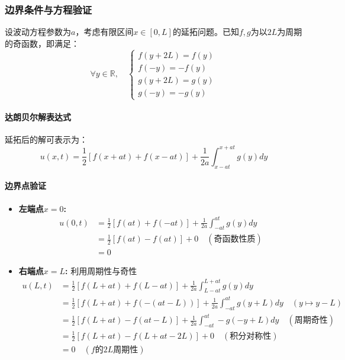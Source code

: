 \documentclass[12pt,a4paper]{article}
\numberwithin{subsection}{section}   %
\numberwithin{subsubsection}{subsection}
\theoremstyle{plain}
\theoremstyle{definition}
\theoremstyle{remark}
\theoremstyle{remark}
\begin{document}
\subsubsection{边界条件与方程验证}
设波动方程参数为$a$，考虑有限区间$x \in [0, L]$的延拓问题。已知$f,g$为以$2L$为周期的奇函数，即满足：
\begin{equation}
	\forall y \in \mathbb{R},\quad 
	\begin{cases}
		f(y + 2L) = f(y) \\
		f(-y) = -f(y) \\
		g(y + 2L) = g(y) \\
		g(-y) = -g(y)
	\end{cases}
\end{equation}

\paragraph{达朗贝尔解表达式}
延拓后的解可表示为：
\begin{equation}
	u(x,t) = \frac{1}{2}[f(x + at) + f(x - at)] + \frac{1}{2a}\int_{x-at}^{x+at} g(y) dy
\end{equation}

\paragraph{边界点验证}
\begin{itemize}
	\item \textbf{左端点$x=0$:}
	\begin{align*}
		u(0,t) &= \frac{1}{2}[f(at) + f(-at)] + \frac{1}{2a}\int_{-at}^{at} g(y) dy \\
		&= \frac{1}{2}[f(at) - f(at)] + 0 \quad (\text{奇函数性质}) \\
		&= 0
	\end{align*}
	
	\item \textbf{右端点$x=L$:} 利用周期性与奇性
	\begin{align*}
		u(L,t) &= \frac{1}{2}[f(L+at) + f(L-at)] + \frac{1}{2a}\int_{L-at}^{L+at} g(y) dy \\
		&= \frac{1}{2}[f(L+at) + f(-(at-L))] + \frac{1}{2a}\int_{-at}^{at} g(y+L) dy \quad (y \mapsto y-L) \\
		&= \frac{1}{2}[f(L+at) - f(at-L)] + \frac{1}{2a}\int_{-at}^{at} -g(-y+L) dy \quad (\text{周期奇性}) \\
		&= \frac{1}{2}[f(L+at) - f(L+at-2L)] + 0 \quad (\text{积分对称性}) \\
		&= 0 \quad ( f\text{的}2L\text{周期性})
	\end{align*}
\end{itemize}
\end{document}
